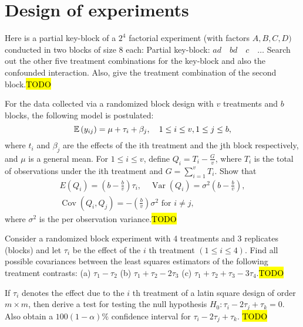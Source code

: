
\chapter{Design of experiments\label{chap:designOfExperiments}}
\begin{example}
\label{exa:isi2004samplepsb5}Here is a partial key-block of a $2^{4}$
factorial experiment (with factors $A,B,C,D)$ conducted in two blocks
of size 8 each: Partial key-block: $ad\quad bd\quad c\quad\ldots$
Search out the other five treatment combinations for the key-block
and also the confounded interaction. Also, give the treatment combination
of the second block.\hl{TODO}
\end{example}

\begin{example}
\label{exa:isi2006samplepsb10}For the data collected via a randomized
block design with $v$ treatments and $b$ blocks, the following model
is postulated: 
\[
\mathbb{E}\left(y_{ij}\right)=\mu+\tau_{i}+\beta_{j},\quad1\leq i\leq v,1\leq j\leq b,
\]
 where $t_{i}$ and $\beta_{j}$ are the effects of the ith treatment
and the jth block respectively, and $\mu$ is a general mean. For
$1\leq i\leq v$, define $Q_{i}=T_{i}-\frac{G}{v}$, where $T_{i}$
is the total of observations under the ith treatment and $G=\sum_{i=1}^{v}T_{i}$.
Show that 
\[
\begin{array}{r}
E\left(Q_{i}\right)=\left(b-\frac{b}{v}\right)\tau_{i},\quad\operatorname{Var}\left(Q_{i}\right)=\sigma^{2}\left(b-\frac{b}{v}\right),\\
\operatorname{Cov}\left(Q_{i},Q_{j}\right)=-\left(\frac{b}{v}\right)\sigma^{2}\text{ for }i\neq j,
\end{array}
\]
 where $\sigma^{2}$ is the per observation variance.\hl{TODO}
\end{example}

\begin{example}
\label{exa:isi2008samplepsb12}Consider a randomized block experiment
with 4 treatments and 3 replicates (blocks) and let $\tau_{i}$ be
the effect of the $i$ th treatment $(1\leq i\leq4)$. Find all possible
covariances between the least squares estimators of the following
treatment contrasts: (a) $\tau_{1}-\tau_{2}$ (b) $\tau_{1}+\tau_{2}-2\tau_{3}$
(c) $\tau_{1}+\tau_{2}+\tau_{3}-3\tau_{4}$.\hl{TODO}
\end{example}

\begin{example}
	\label{exa:isi2009samplepsb12}
	If $\tau_i$ denotes the effect due to the $i$ th treatment of a latin square design of order $m \times m$, then derive a test for testing the null hypothesis $H_0: \tau_i-2 \tau_j+\tau_k=0$. Also obtain a $100(1-\alpha) \%$ confidence interval for $\tau_i-2 \tau_j+\tau_k$.
	\hl{TODO}
\end{example}


